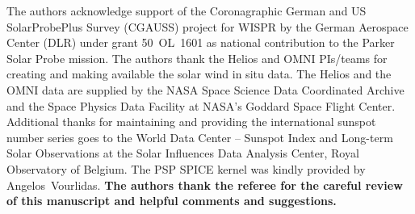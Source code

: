 \begin{acknowledgements}
	The authors acknowledge support of the Coronagraphic German and US SolarProbePlus Survey (CGAUSS) project for WISPR by the German Aerospace Center (DLR) under grant 50~OL~1601 as national contribution to the Parker Solar Probe mission. The authors thank the Helios and OMNI PIs/teams for creating and making available the solar wind in situ data. The Helios and the OMNI data are supplied by the NASA Space Science Data Coordinated Archive and the Space Physics Data Facility at NASA's Goddard Space Flight Center. Additional thanks for maintaining and providing the international sunspot number series goes to the World Data Center -- Sunspot Index and Long-term Solar Observations at the Solar Influences Data Analysis Center, Royal Observatory of Belgium. The PSP SPICE kernel was kindly provided by Angelos~Vourlidas. \textbf{The authors thank the referee for the careful review of this manuscript and helpful comments and suggestions.}
\end{acknowledgements}
